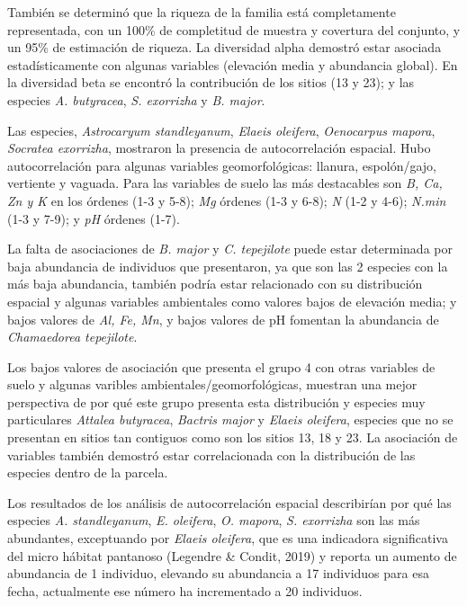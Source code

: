 \documentclass[11pt,]{article}
\begin{document}
También se determinó que la riqueza de la familia está completamente
representada, con un 100\% de completitud de muestra y covertura del
conjunto, y un 95\% de estimación de riqueza. La diversidad alpha
demostró estar asociada estadísticamente con algunas variables
(elevación media y abundancia global). En la diversidad beta se encontró
la contribución de los sitios (13 y 23); y las especies \emph{A.
butyracea}, \emph{S. exorrizha} y \emph{B. major}.

Las especies, \emph{Astrocaryum standleyanum}, \emph{Elaeis oleifera},
\emph{Oenocarpus mapora}, \emph{Socratea exorrizha}, mostraron la
presencia de autocorrelación espacial. Hubo autocorrelación para algunas
variables geomorfológicas: llanura, espolón/gajo, vertiente y vaguada.
Para las variables de suelo las más destacables son \emph{B, Ca, Zn y K}
en los órdenes (1-3 y 5-8); \emph{Mg} órdenes (1-3 y 6-8); \emph{N} (1-2
y 4-6); \emph{N.min} (1-3 y 7-9); y \emph{pH} órdenes (1-7).

La falta de asociaciones de \emph{B. major} y \emph{C. tepejilote} puede
estar determinada por baja abundancia de individuos que presentaron, ya
que son las 2 especies con la más baja abundancia, también podría estar
relacionado con su distribución espacial y algunas variables ambientales
como valores bajos de elevación media; y bajos valores de \emph{Al, Fe,
Mn}, y bajos valores de pH fomentan la abundancia de \emph{Chamaedorea
tepejilote}.

Los bajos valores de asociación que presenta el grupo 4 con otras
variables de suelo y algunas varibles ambientales/geomorfológicas,
muestran una mejor perspectiva de por qué este grupo presenta esta
distribución y especies muy particulares \emph{Attalea butyracea},
\emph{Bactris major} y \emph{Elaeis oleifera}, especies que no se
presentan en sitios tan contiguos como son los sitios 13, 18 y 23. La
asociación de variables también demostró estar correlacionada con la
distribución de las especies dentro de la parcela.

Los resultados de los análisis de autocorrelación espacial describirían
por qué las especies \emph{A. standleyanum}, \emph{E. oleifera},
\emph{O. mapora}, \emph{S. exorrizha} son las más abundantes,
exceptuando por \emph{Elaeis oleifera}, que es una indicadora
significativa del micro hábitat pantanoso (Legendre \& Condit, 2019) y
reporta un aumento de abundancia de 1 individuo, elevando su abundancia
a 17 individuos para esa fecha, actualmente ese número ha incrementado a
20 individuos.
\end{document}

